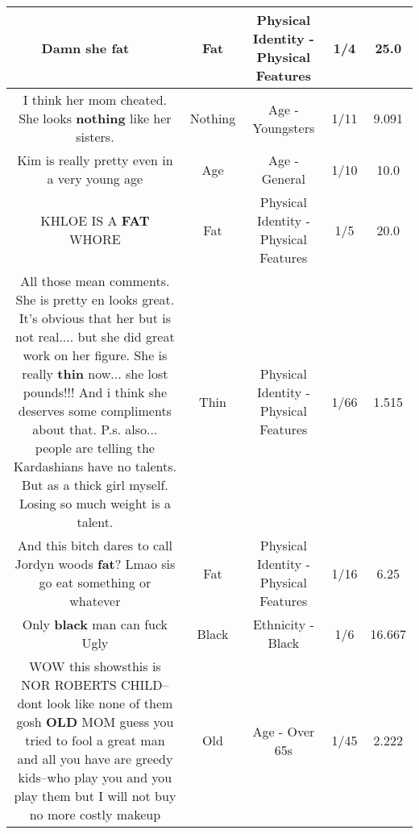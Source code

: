 \documentclass[11pt]{article}
\newlength\mylength
\begin{document}
\begin{center}
\begin{longtable}{|C{.65\mylength}|C{.30\mylength}|C{.12\mylength}|C{.12\mylength}|C{.12\mylength}|}
  \small Damn she \textbf{fat} 😬😬😬😬\normalsize   & Fat & Physical Identity - Physical Features & 1/4 & 25.0 \\  \hline
  \small I think her mom cheated. She looks \textbf{nothing} like her sisters.\normalsize   & Nothing & Age - Youngsters & 1/11 & 9.091 \\  \hline
  \small Kim is really pretty even in a very young age\normalsize   & Age & Age - General & 1/10 & 10.0 \\  \hline
  \small KHLOE IS A \textbf{FAT} WHORE\normalsize   & Fat & Physical Identity - Physical Features & 1/5 & 20.0 \\  \hline
  \small All those mean comments. She is pretty en looks great. It's obvious that her but is not real.... but she did great work on her figure. She is really \textbf{thin} now... she lost pounds!!! And i think she deserves some compliments about that. P.s. also... people are telling the Kardashians have no talents. But as a thick girl myself. Losing so much weight is a talent.\normalsize   & Thin & Physical Identity - Physical Features & 1/66 & 1.515 \\  \hline
  \small And this bitch dares to call Jordyn woods \textbf{fat}? Lmao sis go eat something or whatever\normalsize   & Fat & Physical Identity - Physical Features & 1/16 & 6.25 \\  \hline
  \small Only \textbf{black} man can fuck Ugly\normalsize   & Black & Ethnicity - Black & 1/6 & 16.667 \\  \hline
  \small WOW this showsthis is NOR ROBERTS CHILD--dont look like none of them gosh \textbf{OLD} MOM guess you tried to fool a great man and all you have are greedy kids--who play you and you play them but I will not buy no more costly makeup\normalsize   & Old & Age - Over 65s & 1/45 & 2.222 \\  \hline

\end{longtable}
\end{center}
\end{document}
